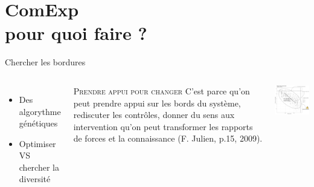 \documentclass[newPxFont]{beamer}
\begin{document}

\section{ComExp\\ pour quoi faire ?}

\begin{frame}[c]{Chercher les bordures}
  \vspace{-1cm}
  \begin{columns}[onlytextwidth,T]
    \column{\dimexpr\linewidth-30mm-5mm}
        \begin{itemize}
          \item Des algorythme génétiques
          \item Optimiser VS chercher la diversité
        \end{itemize}
        \begin{alertblock}{\textsc{Prendre appui pour changer}}
          C'est parce qu'on peut prendre appui sur les bords du système, rediscuter les contrôles, donner du sens aux intervention qu'on peut transformer les rapports de forces et la connaissance (F. Julien, p.15, 2009).
         \end{alertblock}
    \column{30mm}
    \vspace{0.5cm}
    \includegraphics[width=7cm]{img/pse.png}
  \end{columns}
\end{frame}
\end{document}
